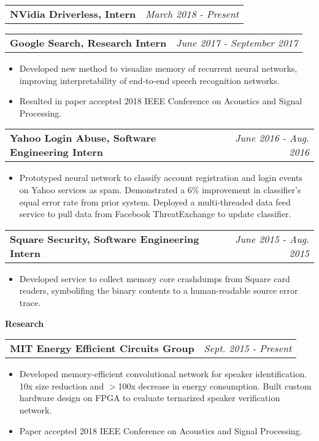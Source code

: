 \documentclass[letterpaper,11pt]{article}
\makeatletter
\newcommand{\resitem}[1]{\item[--] #1 \vspace{-4pt}}
\newcommand{\ressubheadingtwo}[2] {
\begin{tabular*}{7in}{l@{\extracolsep{\fill}}r}
	\textbf{#1} & \textit{#2} \\
\end{tabular*}\vspace{-6pt}}
\makeatother
\begin{document}
    \ressubheadingtwo{NVidia Driverless, Intern}{March 2018 - Present}
    \vspace{0.5mm}

	\ressubheadingtwo{Google Search, Research Intern}{June 2017 - September 2017}
	\begin{itemize}
            \resitem{Developed new method to visualize memory of recurrent neural networks, improving interpretability of end-to-end speech recognition networks.}
            \resitem{Resulted in paper accepted 2018 IEEE Conference on Acoustics and Signal Processing. }
	\end{itemize}

	\ressubheadingtwo{Yahoo Login Abuse, Software Engineering Intern}{June 2016 - Aug. 2016}
	\begin{itemize}
            \resitem{Prototyped neural network to classify account registration and login events on Yahoo services as spam. Demonstrated a 6\% improvement in classifier's equal error rate from prior system. Deployed a multi-threaded data feed service to pull data from Facebook ThreatExchange to update classifier.}
	\end{itemize}

    \vspace{0.05in}

    \vspace{0.05in}
	\ressubheadingtwo{Square Security, Software Engineering Intern}{June 2015 - Aug. 2015}
	\begin{itemize}
            \resitem{Developed service to collect memory core crashdumps from Square card readers, symbolifing the binary contents to a human-readable source error trace.}
	\end{itemize}

    \vspace{0.05in}

\large \textbf{Research \vspace{1mm}} \normalsize
    \vspace{0.05in}

	\ressubheadingtwo{MIT Energy Efficient Circuits Group}{Sept. 2015 - Present}{}
	\begin{itemize}
            \resitem{Developed memory-efficient convolutional network for speaker identification. 10x size reduction and $>$100x decrease in energy consumption. Built custom hardware design on FPGA to evaluate ternarized speaker verification network.}
            \resitem{Paper accepted 2018 IEEE Conference on Acoustics and Signal Processing. }
	\end{itemize}
\end{document}
